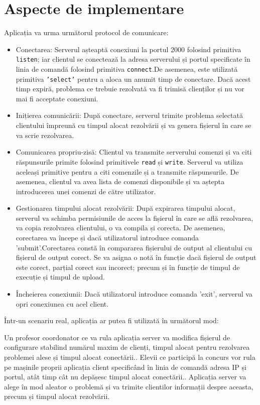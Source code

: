 \documentclass[runningheads]{llncs}
\begin{document}
\section{Aspecte de implementare}
Aplicația va urma următorul protocol de comunicare:
\begin{itemize}
    \item Conectarea: Serverul așteaptă conexiuni la portul 2000 folosind primitiva \texttt{listen}; iar clientul se conectează la adresa serverului și portul specificate în linia de comandă folosind primitiva \texttt{connect}.De asemenea, este utilizată primitiva \texttt{'select'} pentru a aloca un anumit timp de conectare. Dacă acest timp expiră, problema ce trebuie rezolvată va fi trimisă clienților și nu vor mai fi acceptate conexiuni.
    \item Inițierea comunicării: După conectare, serverul trimite problema selectată clientului împreună cu timpul alocat rezolvării și va genera fișierul în care se va scrie rezolvarea.
    \item Comunicarea propriu-zisă: Clientul va transmite serverului comenzi și va citi răspunsurile primite folosind primitivele \texttt{read} și \texttt{write}. Serverul va utiliza aceleași primitive pentru a citi comenzile și a transmite răspunsurile. De asemenea, clientul va avea lista de comenzi disponibile și va aștepta introducerea unei comenzi de către utilizator.
    \item Gestionarea timpului alocat rezolvării: După expirarea timpului alocat, serverul va schimba permisiunile de acces la fișierul în care se află rezolvarea, va copia rezolvarea clientului, o va compila și corecta. De asemenea, corectarea va începe și dacă utilizatorul introduce comanda 'submit'.Corectarea constă în compararea fișierului de output al clientului cu fișierul de output corect. Se va asigna o notă în funcție dacă fișierul de output este corect, parțial corect sau incorect; precum și în funcție de timpul de execuție și timpul de upload.
    \item Încheierea conexiunii: Dacă utilizatorul introduce comanda 'exit', serverul va opri conexiunea cu acel client.
\end{itemize}

\hspace{1em}Într-un scenariu real, aplicația ar putea fi utilizată în următorul mod:

\hspace{1em}Un profesor coordonator ce va rula aplicația server va modifica fișierul de configurare stabilind numărul maxim de clienți, timpul alocat pentru rezolvarea problemei alese și timpul alocat conectării..
Elevii ce participă la concurs vor rula pe mașinile proprii aplicația client specificând în linia de comandă adresa IP și portul, atât timp cât nu depășesc timpul alocat conectării..
Aplicația server va alege în mod aleator o problemă și va trimite clientilor informații despre aceasta, precum și timpul alocat rezolvării.
\end{document}
